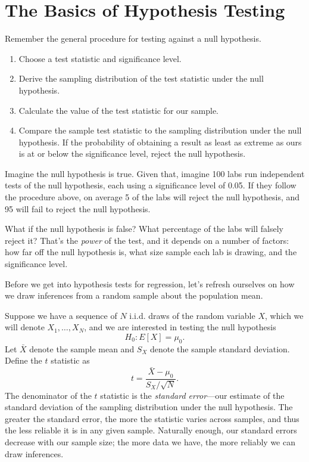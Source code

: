 \documentclass[12pt,oneside,openany]{book}
\begin{document}
\section{The Basics of Hypothesis
Testing}\label{the-basics-of-hypothesis-testing}

Remember the general procedure for testing against a null hypothesis.

\begin{enumerate}
\def\labelenumi{\arabic{enumi}.}
\item
  Choose a test statistic and significance level.
\item
  Derive the sampling distribution of the test statistic under the null
  hypothesis.
\item
  Calculate the value of the test statistic for our sample.
\item
  Compare the sample test statistic to the sampling distribution under
  the null hypothesis. If the probability of obtaining a result as least
  as extreme as ours is at or below the significance level, reject the
  null hypothesis.
\end{enumerate}

Imagine the null hypothesis is true. Given that, imagine 100 labs run
independent tests of the null hypothesis, each using a significance
level of 0.05. If they follow the procedure above, on average 5 of the
labs will reject the null hypothesis, and 95 will fail to reject the
null hypothesis.

What if the null hypothesis is false? What percentage of the labs will
falsely reject it? That's the \emph{power} of the test, and it depends
on a number of factors: how far off the null hypothesis is, what size
sample each lab is drawing, and the significance level.

Before we get into hypothesis tests for regression, let's refresh
ourselves on how we draw inferences from a random sample about the
population mean.

Suppose we have a sequence of \(N\) i.i.d. draws of the random variable
\(X\), which we will denote \(X_1, \ldots, X_N\), and we are interested
in testing the null hypothesis \[
H_0 : E[X] = \mu_0.
\] Let \(\bar{X}\) denote the sample mean and \(S_X\) denote the sample
standard deviation. Define the \(t\) statistic as \[
t = \frac{\bar{X} - \mu_0}{S_X / \sqrt{N}}.
\] The denominator of the \(t\) statistic is the \emph{standard
error}---our estimate of the standard deviation of the sampling
distribution under the null hypothesis. The greater the standard error,
the more the statistic varies across samples, and thus the less reliable
it is in any given sample. Naturally enough, our standard errors
decrease with our sample size; the more data we have, the more reliably
we can draw inferences.
\end{document}
